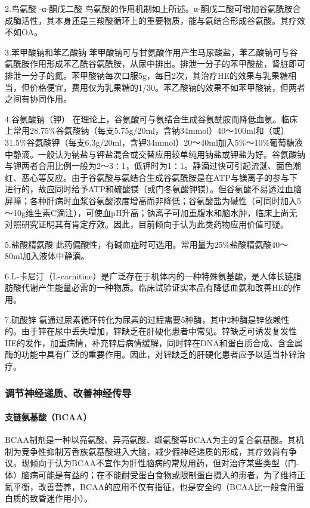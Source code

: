 2.鸟氨酸 -α-酮戊二酸
鸟氨酸的作用机制如上所述。α-酮戊二酸可增加谷氨酰胺合成酶活性，其本身还是三羧酸循环上的重要物质，能与氨结合形成谷氨酸。其疗效不如OA。

3.苯甲酸钠和苯乙酸钠
苯甲酸钠可与甘氨酸作用产生马尿酸盐，苯乙酸钠可与谷氨酰胺作用形成苯乙酰谷氨酰胺，从尿中排出。排泄一分子的苯甲酸盐，肾脏即可排泄一分子的氮。苯甲酸钠每次口服5g，每日2次，其治疗HE的效果与乳果糖相当，但价格便宜，费用仅为乳果糖的1/30。苯乙酸钠的效果不如苯甲酸钠，但两者之间有协同作用。

4.谷氨酸钠（钾）
在理论上，谷氨酸可与氨结合生成谷氨酰胺而降低血氨。临床上常用28.75\%谷氨酸钠（每支5.75g/20ml，含钠34mmol）40～100ml和（或）31.5\%谷氨酸钾（每支6.3g/20ml，含钾34mmol）20～40ml加入5\%～10\%葡萄糖液中静滴。一般认为钠盐与钾盐混合或交替应用较单纯用钠盐或钾盐为好。谷氨酸钠与钾两者合用比例一般为2～3∶1，低钾时为1∶1。静滴过快可引起流涎、面色潮红、恶心等反应。由于谷氨酸与氨结合生成谷氨酰胺是在ATP与镁离子的参与下进行的，故应同时给予ATP和硫酸镁（或门冬氨酸钾镁）。但谷氨酸不易透过血脑屏障；各种肝病时血浆谷氨酸浓度增高而非降低；谷氨酸盐为碱性（可同时加入5～10g维生素C滴注），可使血pH升高；钠离子可加重腹水和脑水肿，临床上尚无对照研究证明其有肯定疗效。因此，目前倾向于认为此类药物应用价值可疑。

5.盐酸精氨酸
此药偏酸性，有碱血症时可选用。常用量为25\%盐酸精氨酸40～80ml加入液体中静滴。

6.L-卡尼汀（L-carnitine）是广泛存在于机体内的一种特殊氨基酸，是人体长链脂肪酸代谢产生能量必需的一种物质。临床试验证实本品有降低血氨和改善HE的作用。

7.硫酸锌
氨通过尿素循环转化为尿素的过程需要5种酶，其中2种酶是锌依赖性的。由于锌在尿中丢失增加，锌缺乏在肝硬化患者中常见。锌缺乏可诱发复发性HE的发作，加重病情，补充锌后病情缓解，同时锌在DNA和蛋白质合成、含金属酶的功能中具有广泛的重要作用。因此，对锌缺乏的肝硬化患者应予以适当补锌治疗。

\subsubsection{调节神经递质、改善神经传导}

\paragraph{支链氨基酸（BCAA）}

BCAA制剂是一种以亮氨酸、异亮氨酸、缬氨酸等BCAA为主的复合氨基酸。其机制为竞争性抑制芳香族氨基酸进入大脑，减少假神经递质的形成，其疗效尚有争议。现倾向于认为BCAA不宜作为肝性脑病的常规用药，但对治疗某些类型（门-体）脑病可能是有益的；在不能耐受蛋白食物或限制蛋白摄入的患者，为了维持正氮平衡，改善营养，BCAA的应用不仅有指征，也是安全的（BCAA比一般食用蛋白质的致昏迷作用小）。

